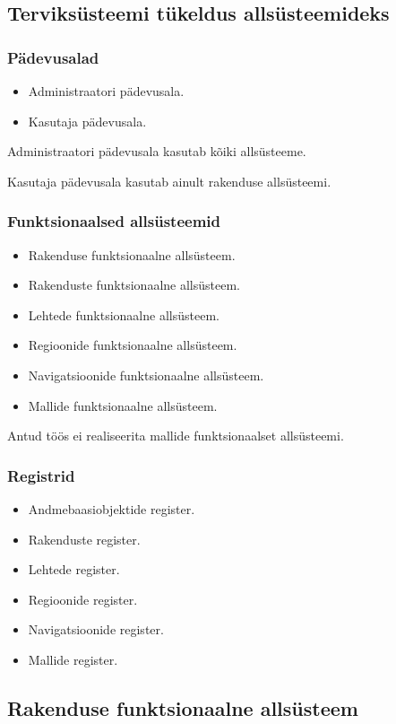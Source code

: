 \documentclass[a4paper,12pt]{article} %
\begin{document}
\subsection{Terviksüsteemi tükeldus allsüsteemideks}
\subsubsection{Pädevusalad}
\begin{itemize}
\item Administraatori pädevusala.
\item Kasutaja pädevusala.
\end{itemize}
Administraatori pädevusala kasutab kõiki allsüsteeme.\par
Kasutaja pädevusala kasutab ainult rakenduse allsüsteemi.
\subsubsection{Funktsionaalsed allsüsteemid}
\begin{itemize}
\item Rakenduse funktsionaalne allsüsteem.
\item Rakenduste funktsionaalne allsüsteem.
\item Lehtede funktsionaalne allsüsteem.
\item Regioonide funktsionaalne allsüsteem.
\item Navigatsioonide funktsionaalne allsüsteem.
\item Mallide funktsionaalne allsüsteem.
\end{itemize}
Antud töös ei realiseerita mallide funktsionaalset allsüsteemi.
\subsubsection{Registrid}
\begin{itemize}
\item Andmebaasiobjektide register.
\item Rakenduste register.
\item Lehtede register.
\item Regioonide register.
\item Navigatsioonide register.
\item Mallide register.
\end{itemize}

\subsection{Rakenduse funktsionaalne allsüsteem}
\end{document}
